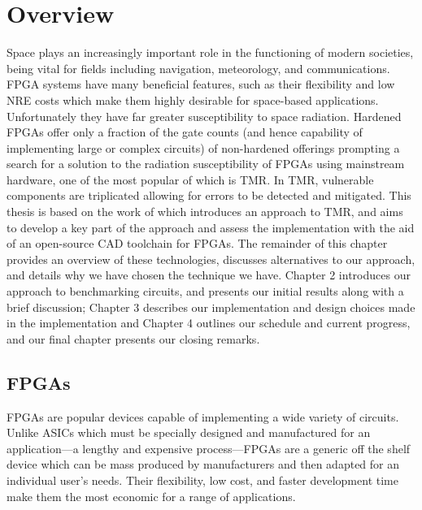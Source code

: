 \documentclass[12pt,final,oneside]{dwThesis} %
\begin{document}
   \section{Overview}
   Space plays an increasingly
   important role in the functioning of modern societies, being vital for
   fields including navigation, meteorology, and
   communications\cite{OECDSpace}. \gls{FPGA} systems have many beneficial
   features, such as their flexibility and low \gls{NRE} costs which make them
   highly desirable for space-based applications. Unfortunately they have far
   greater susceptibility to space radiation. Hardened \glspl{FPGA} offer only
   a fraction of the gate counts (and hence capability of implementing large or
   complex circuits) of non-hardened offerings prompting a search for a
   solution to the radiation susceptibility of \glspl{FPGA} using mainstream
   hardware\cite{VFPGATMR}, one of the most popular of which is \gls{TMR}. In
   \gls{TMR}, vulnerable components are triplicated allowing for errors to be
   detected and mitigated. This thesis is based on the work
   of\cite{DiesselChange} which introduces an approach to \gls{TMR}, and aims
   to develop a key part of the approach and assess the implementation with the
   aid of an open-source \gls{CAD} toolchain for \glspl{FPGA}.
    The remainder of this chapter provides an overview of
   these technologies, discusses alternatives to our approach, and details why
   we have chosen the technique we have. Chapter 2 introduces our approach to
   benchmarking circuits, and presents our initial results along with a brief
   discussion; Chapter 3 describes our implementation and design choices made
   in the implementation and Chapter 4 outlines our schedule and current
   progress, and our final chapter presents our closing remarks.  \glsresetall
   \subsection{\glspl{FPGA}
   } \glspl{FPGA} are popular devices
   capable of implementing a wide variety of circuits. Unlike \glspl{ASIC}
   which must be specially designed and manufactured for an application---a
   lengthy and expensive process---\glspl{FPGA} are a generic off the shelf
   device which can be mass produced by manufacturers and then adapted for an
   individual user's needs. Their flexibility, low cost, and faster development
   time make them the most economic for a range of applications.
\end{document}
